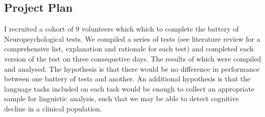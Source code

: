 \documentclass{article}
\begin{document}
\subsection{Project Plan}
I recruited a cohort of 9 volunteers which which to complete the battery of Neuropsychological tests. We compiled a series of tests (see literature review for a comprehensive list, explanation and rationale for each test) and completed each version of the test on three consequetive days. The results of which were compiled and analysed. The hypothesis is that there would be no difference in performance between one battery of tests and another. An additional hypothesis is that the language tasks included on each task would be enough to collect an appropriate sample for linguistic analysis, such that we may be able to detect cognitive decline in a clinical population. \newline
\end{document}
